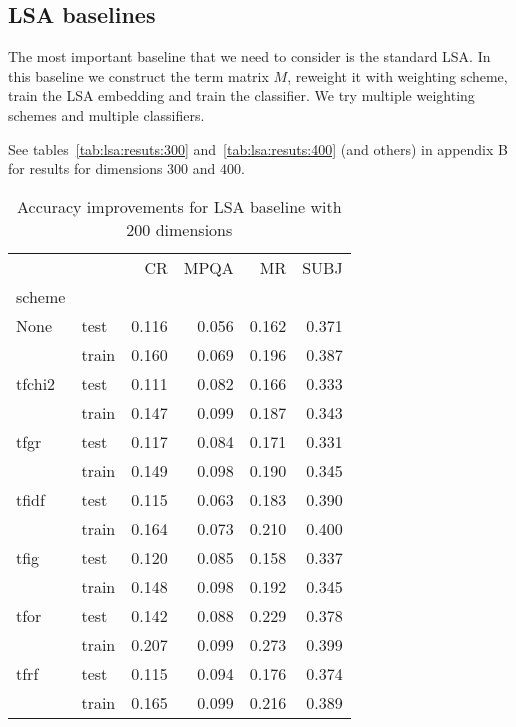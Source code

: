     \subsection{LSA baselines} \label{sec:lsa:baseline}
    The most important baseline that we need to consider is the standard LSA.
    In this baseline we construct the term matrix $M$, reweight it with weighting scheme, train the LSA embedding and train the classifier.
    We try multiple weighting schemes and multiple classifiers.
    
    See tables~\ref{tab:lsa:resuts:300} and~\ref{tab:lsa:resuts:400} (and others) in appendix B for results for dimensions $300$ and $400$.
    
\begin{table}[H]
\begin{center}

\begin{tabular}{llrrrr}
\toprule
{} &      &  CR &  MPQA &  MR &  SUBJ \\
scheme &  &            &              &            &              \\
\midrule
None & test &      0.116 &        0.056 &      0.162 &        0.371 \\
{} & train &      0.160 &        0.069 &      0.196 &        0.387 \\
tfchi2 & test &      0.111 &        0.082 &      0.166 &        0.333 \\
{} & train &      0.147 &        0.099 &      0.187 &        0.343 \\
tfgr & test &      0.117 &        0.084 &      0.171 &        0.331 \\
{} & train &      0.149 &        0.098 &      0.190 &        0.345 \\
tfidf & test &      0.115 &        0.063 &      0.183 &        0.390 \\
{} & train &      0.164 &        0.073 &      0.210 &        0.400 \\
tfig & test &      0.120 &        0.085 &      0.158 &        0.337 \\
{} & train &      0.148 &        0.098 &      0.192 &        0.345 \\
tfor & test &      0.142 &        0.088 &      0.229 &        0.378 \\
{} & train &      0.207 &        0.099 &      0.273 &        0.399 \\
tfrf & test &      0.115 &        0.094 &      0.176 &        0.374 \\
{} & train &      0.165 &        0.099 &      0.216 &        0.389 \\
\bottomrule
\end{tabular}

\caption[Accuracy improvements for LSA baseline with 200 dimensions]{Accuracy improvements for LSA baseline with 200 dimensions}
\label{tab:lsa:resuts:200:main}
\end{center}
\end{table}
    
